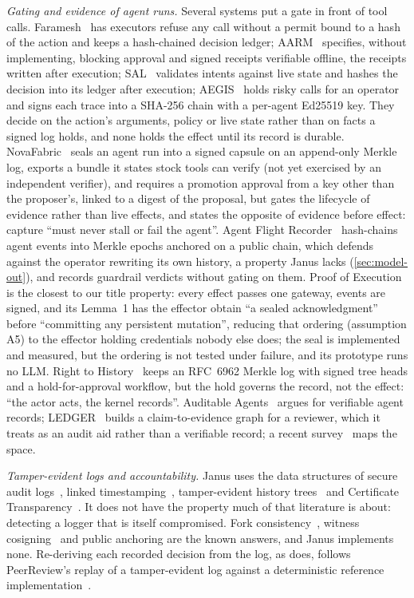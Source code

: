 \emph{Gating and evidence of agent runs.} Several systems put a gate in front of
tool calls. Faramesh~\cite{faramesh} has executors refuse any call without a
permit bound to a hash of the action and keeps a hash-chained decision ledger;
AARM~\cite{aarm} specifies, without implementing, blocking approval and signed
receipts verifiable offline, the receipts written after execution;
SAL~\cite{sal} validates intents against live state and hashes the decision into
its ledger after execution; AEGIS~\cite{aegis} holds risky calls for an operator
and signs each trace into a SHA-256 chain with a per-agent Ed25519 key. They
decide on the action's arguments, policy or live state rather than on facts a
signed log holds, and none holds the effect until its record is durable.
NovaFabric~\cite{novafabric} seals an agent run into a signed capsule on an
append-only Merkle log, exports a bundle it states stock tools can verify (not
yet exercised by an independent verifier), and requires a promotion approval
from a key other than the proposer's, linked to a digest of the proposal, but
gates the lifecycle of evidence rather than live effects, and states the
opposite of evidence before effect: capture ``must never stall or fail the
agent''. Agent Flight Recorder~\cite{agentflightrecorder} hash-chains agent
events into Merkle epochs anchored on a public chain, which defends against the
operator rewriting its own history, a property Janus lacks
(\cref{sec:model-out}), and records guardrail verdicts without gating on them.
Proof of Execution~\cite{proofofexecution} is the closest to our title property:
every effect passes one gateway, events are signed, and its Lemma~1 has the
effector obtain ``a sealed acknowledgment'' before ``committing any persistent
mutation'', reducing that ordering (assumption A5) to the effector holding
credentials nobody else does; the seal is implemented and measured, but the
ordering is not tested under failure, and its prototype runs no LLM. Right to
History~\cite{righttohistory} keeps an RFC~6962 Merkle log with signed tree heads
and a hold-for-approval workflow, but the hold governs the record, not the
effect: ``the actor acts, the kernel records''. Auditable
Agents~\cite{auditableagents} argues for verifiable agent records;
LEDGER~\cite{ledger} builds a claim-to-evidence graph for a reviewer, which it
treats as an audit aid rather than a verifiable record; a recent
survey~\cite{tracestotrust} maps the space.

\emph{Tamper-evident logs and accountability.} Janus uses the data structures of
secure audit logs~\cite{schneierkelsey}, linked timestamping~\cite{haberstornetta},
tamper-evident history trees~\cite{crosbywallach} and Certificate
Transparency~\cite{rfc6962,rfc9162}. It does not have the property much of that
literature is about: detecting a logger that is itself compromised. Fork
consistency~\cite{sundr}, witness cosigning~\cite{cosi} and public anchoring are
the known answers, and Janus implements none. Re-deriving each recorded decision
from the log, as  does, follows PeerReview's replay of a
tamper-evident log against a deterministic reference
implementation~\cite{peerreview}.

